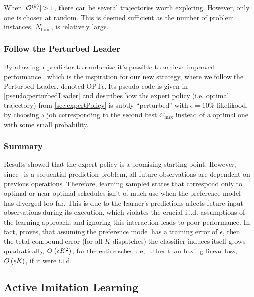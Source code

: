 \documentclass[smallextended]{svjour3}
\begin{document}
When $\lvert\mathcal{O}^{(k)}\rvert>1$, there can be several trajectories worth 
exploring. However, only one is chosen at random. This is deemed sufficient as 
the number of problem instances, $N_{\text{train}}$, is relatively large.

\subsubsection{Follow the Perturbed Leader}\label{sec:perturbedLeader}
By allowing a predictor to randomise it's possible to achieve improved 
performance \cite{CesaBianchi06,Hannan57}, which is the inspiration for our new 
strategy, where we follow the Perturbed Leader, denoted OPT$\epsilon$. 
Its pseudo code is given in \cref{pseudo:perturbedLeader} and describes how the 
expert policy (i.e. optimal trajectory) from \cref{sec:expertPolicy} is subtly
``perturbed'' with $\epsilon=10\%$ likelihood, by choosing a job corresponding 
to the second best $C_{\max}$ instead of a optimal one with some small 
probability. 



\subsubsection*{Summary}

Results showed that the expert policy is a promising starting point. 
However, since \jsp\ is a sequential prediction problem, all future 
observations are dependent on previous operations. 
Therefore, learning sampled states that correspond only to optimal or 
near-optimal schedules isn't of much use when the preference model has 
diverged too far. 
This is due to the learner's predictions affects future input observations 
during its execution, which violates the crucial i.i.d. assumptions of the  
learning approach, and ignoring this interaction leads to poor performance.
In fact, \cite{RossB10} proves, that assuming the preference model has a 
training error of $\epsilon$, then the total compound error (for all $K$ 
dispatches) the classifier induces itself grows quadratically, ${O}\left(\epsilon 
  K^2\right)$, for the entire schedule, rather than having linear loss, 
${O}\left(\epsilon K\right)$, if it were i.i.d.


\subsection{Active Imitation Learning}\label{sec:il:active}
\end{document}
